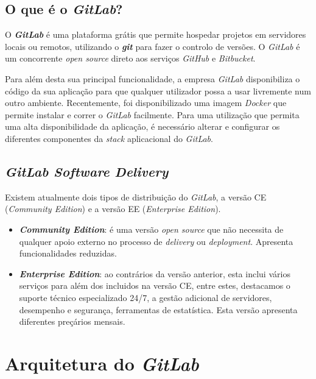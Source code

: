 \documentclass[12pt,a4paper]{article}
\begin{document}
\subsection{O que é o \emph{GitLab}?}
O \textbf{\emph{GitLab}} é uma plataforma grátis que permite hospedar projetos em servidores locais ou remotos, utilizando o \textbf{\emph{git}} para fazer o controlo de versões. O \emph{GitLab} é um concorrente \emph{open source} direto aos serviços \emph{GitHub} e \emph{Bitbucket}.

Para além desta sua principal funcionalidade, a empresa \emph{GitLab} disponibiliza o código da sua aplicação para que qualquer utilizador possa a usar livremente num outro ambiente. Recentemente, foi disponibilizado uma imagem \emph{Docker} que permite instalar e correr o \emph{GitLab} facilmente. Para uma utilização que permita uma alta disponibilidade da aplicação, é necessário alterar e configurar os diferentes componentes da \emph{stack} aplicacional do \emph{GitLab}.

\subsection{\emph{GitLab Software Delivery}}
Existem atualmente dois tipos de distribuição do \emph{GitLab}, a versão CE (\emph{Community Edition}) e a versão EE (\emph{Enterprise Edition}).

\begin{itemize}
    \item \textbf{\emph{Community Edition}}: é uma versão \emph{open source} que não necessita de qualquer apoio externo no processo de \emph{delivery} ou \emph{deployment}. Apresenta funcionalidades reduzidas.
    \item \textbf{\emph{Enterprise Edition}}: ao contrários da versão anterior, esta inclui vários serviços para além dos incluidos na versão CE, entre estes, destacamos o suporte técnico especializado 24/7, a gestão adicional de servidores, desempenho e segurança, ferramentas de estatística. Esta versão apresenta diferentes preçários mensais.
\end{itemize}



\newpage
\section{Arquitetura do \emph{GitLab}}\label{arq}
\end{document}
